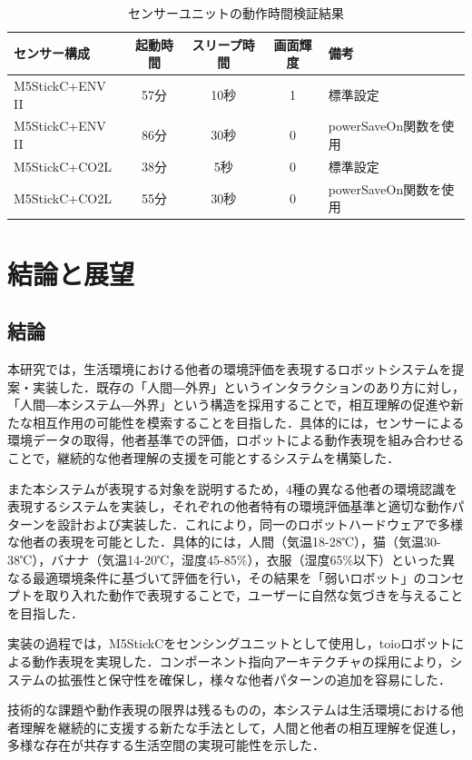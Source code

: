 \documentclass{cuxarticle}
\begin{document}
\begin{table}[h]
  \caption{センサーユニットの動作時間検証結果}
  \label{table:battery}
  \centering
  \begin{tabular}{|l|c|c|c|l|}
    \hline
    センサー構成 & 起動時間 & スリープ時間 & 画面輝度 & 備考 \\
    \hline
    M5StickC+ENV II & 57分 & 10秒 & 1 & 標準設定 \\
    \hline
    M5StickC+ENV II & 86分 & 30秒 & 0 & powerSaveOn関数を使用 \\
    \hline
    M5StickC+CO2L & 38分 & 5秒 & 0 & 標準設定 \\
    \hline
    M5StickC+CO2L & 55分 & 30秒 & 0 & powerSaveOn関数を使用 \\
    \hline
  \end{tabular}
\end{table}

\chapter{結論と展望}

\section{結論}
本研究では，生活環境における他者の環境評価を表現するロボットシステムを提案・実装した．既存の「人間―外界」というインタラクションのあり方に対し，「人間―本システム―外界」という構造を採用することで，相互理解の促進や新たな相互作用の可能性を模索することを目指した．具体的には，センサーによる環境データの取得，他者基準での評価，ロボットによる動作表現を組み合わせることで，継続的な他者理解の支援を可能とするシステムを構築した．

また本システムが表現する対象を説明するため，4種の異なる他者の環境認識を表現するシステムを実装し，それぞれの他者特有の環境評価基準と適切な動作パターンを設計および実装した．これにより，同一のロボットハードウェアで多様な他者の表現を可能とした．具体的には，人間（気温18-28℃），猫（気温30-38℃），バナナ（気温14-20℃，湿度45-85\%），衣服（湿度65\%以下）といった異なる最適環境条件に基づいて評価を行い，その結果を「弱いロボット」のコンセプトを取り入れた動作で表現することで，ユーザーに自然な気づきを与えることを目指した．

実装の過程では，M5StickCをセンシングユニットとして使用し，toioロボットによる動作表現を実現した．コンポーネント指向アーキテクチャの採用により，システムの拡張性と保守性を確保し，様々な他者パターンの追加を容易にした．

技術的な課題や動作表現の限界は残るものの，本システムは生活環境における他者理解を継続的に支援する新たな手法として，人間と他者の相互理解を促進し，多様な存在が共存する生活空間の実現可能性を示した．
\end{document}
